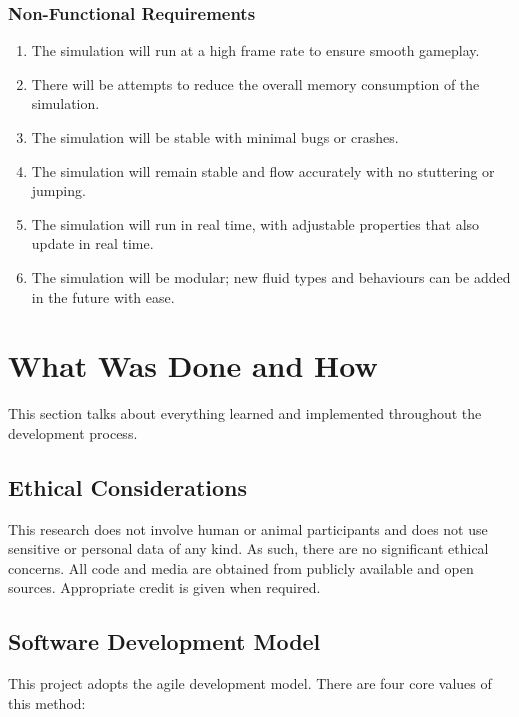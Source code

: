 \documentclass[a4paper, 12pt]{article}
\begin{document}
    \subsubsection{Non-Functional Requirements}

    \begin{enumerate}[label=\textbf{N.F.R. \arabic*}]
        \item The simulation will run at a high frame rate to ensure smooth gameplay.
        \item There will be attempts to reduce the overall memory consumption of the simulation.
        \item The simulation will be stable with minimal bugs or crashes.
        \item The simulation will remain stable and flow accurately with no stuttering or jumping.
        \item The simulation will run in real time, with adjustable properties that also update in real time.
        \item The simulation will be modular; new fluid types and behaviours can be added in the future with ease.
    \end{enumerate}

    \newpage

    \section{What Was Done and How}
    \label{sec:whatwasdoneandhow}

    This section talks about everything learned and implemented throughout the development process.

    \subsection{Ethical Considerations}
    
    This research does not involve human or animal participants and does not use sensitive or personal data of any kind. As such, there are no significant ethical concerns. All code and media are obtained from publicly available and open sources. Appropriate credit is given when required.

    \subsection{Software Development Model}

    This project adopts the agile development model. There are four core values of this method\cite{geekagile}:
    
\end{document}
